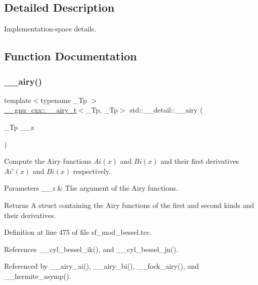 \subsection{Detailed Description}
Implementation-\/space details. 

\subsection{Function Documentation}
\mbox{\label{namespacestd_1_1____detail_ab88aba2ff9e70425c477043a9fa6a0dc}} 
\subsubsection{\texorpdfstring{\+\_\+\+\_\+airy()}{\_\_airy()}}
{\footnotesize\ttfamily template$<$typename \+\_\+\+Tp $>$ \\
\hyperlink{struct____gnu__cxx_1_1____airy__t}{\+\_\+\+\_\+gnu\+\_\+cxx\+::\+\_\+\+\_\+airy\+\_\+t}$<$\+\_\+\+Tp, \+\_\+\+Tp$>$ std\+::\+\_\+\+\_\+detail\+::\+\_\+\+\_\+airy (\begin{DoxyParamCaption}\item[{\+\_\+\+Tp}]{\+\_\+\+\_\+z }\end{DoxyParamCaption})}



Compute the Airy functions $ Ai(x) $ and $ Bi(x) $ and their first derivatives $ Ai'(x) $ and $ Bi(x) $ respectively. 


\begin{DoxyParams}{Parameters}
{\em \+\_\+\+\_\+z} & The argument of the Airy functions. \\
\hline
\end{DoxyParams}
\begin{DoxyReturn}{Returns}
A struct containing the Airy functions of the first and second kinds and their derivatives. 
\end{DoxyReturn}


Definition at line 475 of file sf\+\_\+mod\+\_\+bessel.\+tcc.



References \+\_\+\+\_\+cyl\+\_\+bessel\+\_\+ik(), and \+\_\+\+\_\+cyl\+\_\+bessel\+\_\+jn().



Referenced by \+\_\+\+\_\+airy\+\_\+ai(), \+\_\+\+\_\+airy\+\_\+bi(), \+\_\+\+\_\+fock\+\_\+airy(), and \+\_\+\+\_\+hermite\+\_\+asymp().

